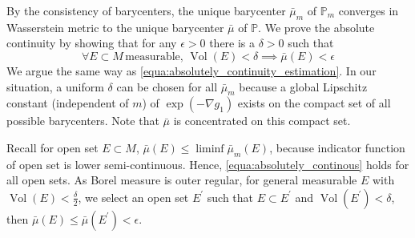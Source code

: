 By the consistency of barycenters, the unique barycenter $\bar{\mu}_m$ of $\mathbb{P}_m$
converges in Wasserstein metric to the unique barycenter $\bar{\mu}$ of $\mathbb{P}$.
We prove the absolute continuity by showing that
for any $\epsilon > 0$ there is a $\delta > 0$ such that
\begin{equation}
	\label{equa:absolutely_continous}
	\forall E \subset M \, \text{measurable, } \operatorname{Vol}(E) < \delta
	\implies \bar{\mu}(E) < \epsilon
\end{equation}
We argue the same way as \cref{equa:absolutely_continuity_estimation}.
In our situation, a uniform $\delta$ can be chosen for all $\bar{\mu}_m$
because a global Lipschitz constant (independent of $m$)
of $\exp( - \nabla g_1)$ exists on the compact set of all possible barycenters.
Note that $\bar{\mu}$ is concentrated on this compact set.

Recall for open set $E \subset M$, $\bar{\mu}(E) \leq \liminf \bar{\mu}_m(E)$,
because indicator function of open set is lower semi-continuous.
Hence, \cref{equa:absolutely_continous} holds for all open sets.
As Borel measure is outer regular, for general measurable $E$ with $\operatorname{Vol}(E) < \frac{\delta}{2}$,
we select an open set $E^\prime$ such that
$ E \subset E^\prime$ and $ \operatorname{Vol}(E^\prime) < \delta$,
then $\bar{\mu}(E) \leq \bar{\mu}(E^\prime) < \epsilon$.
